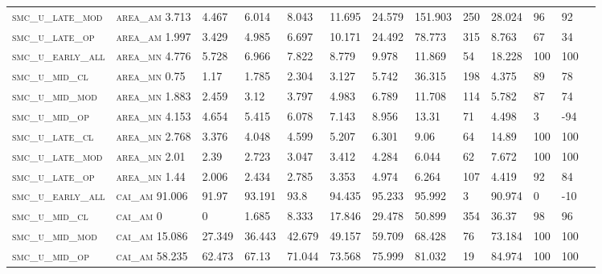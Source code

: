 \begin{landscape}
\begin{center}
\begin{footnotesize}
\begin{longtable}{lllllllllllll}
\textsc{smc\_u\_late\_mod } & \textsc{area\_am  }   3.713    & 4.467    & 6.014    & 8.043    & 11.695   & 24.579   & 151.903  & 250  & 28.024   & 96  & 92   \\
\textsc{smc\_u\_late\_op  } & \textsc{area\_am  }   1.997    & 3.429    & 4.985    & 6.697    & 10.171   & 24.492   & 78.773   & 315  & 8.763    & 67  & 34   \\
\textsc{smc\_u\_early\_all} & \textsc{area\_mn  }   4.776    & 5.728    & 6.966    & 7.822    & 8.779    & 9.978    & 11.869   & 54   & 18.228   & 100 & 100  \\
\textsc{smc\_u\_mid\_cl   } & \textsc{area\_mn  }   0.75     & 1.17     & 1.785    & 2.304    & 3.127    & 5.742    & 36.315   & 198  & 4.375    & 89  & 78   \\
\textsc{smc\_u\_mid\_mod  } & \textsc{area\_mn  }   1.883    & 2.459    & 3.12     & 3.797    & 4.983    & 6.789    & 11.708   & 114  & 5.782    & 87  & 74   \\
\textsc{smc\_u\_mid\_op   } & \textsc{area\_mn  }   4.153    & 4.654    & 5.415    & 6.078    & 7.143    & 8.956    & 13.31    & 71   & 4.498    & 3   & -94  \\
\textsc{smc\_u\_late\_cl  } & \textsc{area\_mn  }   2.768    & 3.376    & 4.048    & 4.599    & 5.207    & 6.301    & 9.06     & 64   & 14.89    & 100 & 100  \\
\textsc{smc\_u\_late\_mod } & \textsc{area\_mn  }   2.01     & 2.39     & 2.723    & 3.047    & 3.412    & 4.284    & 6.044    & 62   & 7.672    & 100 & 100  \\
\textsc{smc\_u\_late\_op  } & \textsc{area\_mn  }   1.44     & 2.006    & 2.434    & 2.785    & 3.353    & 4.974    & 6.264    & 107  & 4.419    & 92  & 84   \\
\textsc{smc\_u\_early\_all} & \textsc{cai\_am   }   91.006   & 91.97    & 93.191   & 93.8     & 94.435   & 95.233   & 95.992   & 3    & 90.974   & 0   & -10  \\
\textsc{smc\_u\_mid\_cl   } & \textsc{cai\_am   }   0        & 0        & 1.685    & 8.333    & 17.846   & 29.478   & 50.899   & 354  & 36.37    & 98  & 96   \\
\textsc{smc\_u\_mid\_mod  } & \textsc{cai\_am   }   15.086   & 27.349   & 36.443   & 42.679   & 49.157   & 59.709   & 68.428   & 76   & 73.184   & 100 & 100  \\
\textsc{smc\_u\_mid\_op   } & \textsc{cai\_am   }   58.235   & 62.473   & 67.13    & 71.044   & 73.568   & 75.999   & 81.032   & 19   & 84.974   & 100 & 100  \\

\end{longtable}
\end{footnotesize}
\end{center}
\end{landscape}

